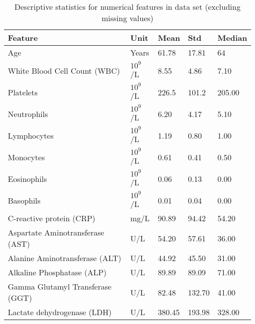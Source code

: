 \begin{table}
\centering
\begin{tabular}{lllll}
Feature                          & Unit                    & Mean   & Std    & 
Median \\ \hline
Age                              & Years                   & 61.78  & 17.81  & 
64     \\
White Blood Cell Count (WBC)     & $10^9$/L & 8.55   & 4.86   & 
7.10   \\
Platelets                        & $10^9$/L & 226.5  & 101.2  & 
205.00 \\
Neutrophils                      & $10^9$/L & 6.20   & 4.17   & 
5.10   \\
Lymphocytes                      & $10^9$/L & 1.19   & 0.80   & 
1.00   \\
Monocytes                        & $10^9$/L & 0.61   & 0.41   & 
0.50   \\
Eosinophils                      & $10^9$/L & 0.06   & 0.13   & 
0.00   \\
Basophils                        & $10^9$/L & 0.01   & 0.04   & 
0.00   \\
C-reactive protein (CRP)         & mg/L                    & 90.89  & 94.42  & 
54.20  \\
Aspartate Aminotransferase (AST) & U/L                     & 54.20  & 57.61  & 
36.00  \\
Alanine Aminotransferase (ALT)   & U/L                     & 44.92  & 45.50  & 
31.00  \\
Alkaline Phosphatase (ALP)       & U/L                     & 89.89  & 89.09  & 
71.00  \\
Gamma Glutamyl Transferase (GGT) & U/L                     & 82.48  & 132.70 & 
41.00  \\
Lactate dehydrogenase (LDH)      & U/L                     & 380.45 & 193.98 & 
328.00
\end{tabular}
\caption{Descriptive statistics for numerical features in data set (excluding 
missing values)}
\label{tab:feature-dist}
\end{table}


